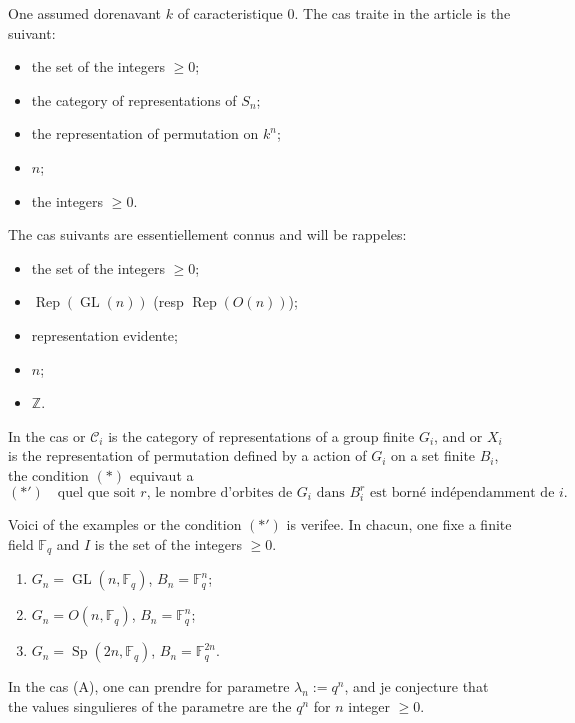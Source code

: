 \documentclass[11pt,a4paper]{article}
\theoremstyle{plain}
\theoremstyle{definition}
\DeclareMathOperator{\Rep}{Rep}
\DeclareMathOperator{\GL}{GL}
\DeclareMathOperator{\Sp}{Sp}
\newcommand{\Z}{\mathbb{Z}}
\begin{document}
One assumed dorenavant $k$ of caracteristique $0$. The cas traite in the article is the suivant:
\begin{itemize}[label={},leftmargin=*]
\item[$I$:] the set of the integers $\geq 0$;
\item[$\mathcal{C}_n$:] the category of representations of $S_n$;
\item[$X_n$:] the representation of permutation on $k^n$;
\item[parametre:] $n$;
\item[values singulieres:] the integers $\geq 0$.
\end{itemize}

The cas suivants are essentiellement connus and will be rappeles:
\begin{itemize}[label={},leftmargin=*]
\item[$I$:] the set of the integers $\geq 0$;
\item[$\mathcal{C}_n$:] $\Rep(\GL(n))$ (resp $\Rep(O(n))$);
\item[$X_n$:] representation evidente;
\item[parametre:] $n$;
\item[values singulieres:] $\Z$.
\end{itemize}

In the cas or $\mathcal{C}_i$ is the category of representations of a group finite $G_i$, and or $X_i$ is the representation of permutation defined by a action of $G_i$ on a set finite $B_i$, the condition $(\ast)$ equivaut a
\begin{equation*}
(\ast') \quad \text{quel que soit $r$, le nombre d'orbites de $G_i$ dans $B_i^r$ est born\'e ind\'ependamment de $i$.}
\end{equation*}

Voici of the examples or the condition $(\ast')$ is verifee. In chacun, one fixe a finite field $\mathbb{F}_q$ and $I$ is the set of the integers $\geq 0$.
\begin{enumerate}[label=(\Alph*)]
\item $G_n = \GL(n, \mathbb{F}_q)$, $B_n = \mathbb{F}_q^n$;
\item $G_n = O(n, \mathbb{F}_q)$, $B_n = \mathbb{F}_q^n$;
\item $G_n = \Sp(2n, \mathbb{F}_q)$, $B_n = \mathbb{F}_q^{2n}$.
\end{enumerate}

In the cas (A), one can prendre for parametre $\lambda_n := q^n$, and je conjecture that the values singulieres of the parametre are the $q^n$ for $n$ integer $\geq 0$.
\end{document}
